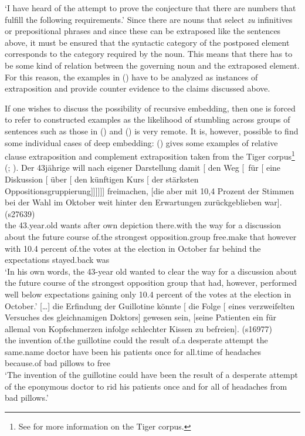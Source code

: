 \glt `I have heard of the attempt to prove the conjecture that there are numbers that fulfill the following requirements.'
\zl
Since there are nouns that select \emph{zu} infinitives or prepositional phrases and since these can
be extraposed like the sentences above, it must be ensured that the syntactic category of the postposed element corresponds to the category required by the noun.
This means that there has to be some kind of relation between the governing noun and the extraposed element. For this reason, the examples in
() have to be analyzed as instances of extraposition and provide counter evidence to the claims discussed above.

If one wishes to discuss the possibility of recursive embedding, then one is forced to refer to constructed examples as the likelihood of stumbling across groups of sentences
such as those in () and () is very remote. It is, however, possible to find some individual cases of deep embedding:
() gives some examples of relative clause extraposition and complement extraposition taken from the Tiger corpus\footnote{
  See  for more information on the Tiger corpus.
} (\citealp[--79]{Mueller2007c}; \citealp[Section~2.1]{MM2009a}).
\eal
\ex 
\gll Der 43jährige will nach eigener Darstellung damit [ den Weg [~für [ eine
  Diskussion [ über [ den künftigen Kurs [ der stärksten
  Oppositions\-gruppierung]]]]]] freimachen, [die aber mit 10,4 Prozent
  der Stimmen bei der Wahl im Oktober weit hinter den Erwartungen zurückgeblieben war]. (s27639)\\
  the 43.year.old wants after own depiction there.with {} the way \hspaceThis{[\sub{PP}~}for {} a discussion {} about {} the future course {} of.the strongest
  opposition.group free.make \spacebr{}that however with 10.4 percent
  of.the votes at the election in October far behind the expectations stayed.back was\\
\glt `In his own words, the 43-year old wanted to clear the way for a discussion about the future course of the strongest opposition group that had, however, performed well below expectations gaining only 10.4 percent of the votes at the election in October.'
\ex 
\gll {}[\ldots] die Erfindung der Guillotine könnte [ die Folge [ eines verzweifelten
    Versuches des gleichnamigen Doktors] gewesen sein, [seine Patienten ein für allemal von
    Kopfschmerzen infolge schlechter Kissen zu befreien]. (s16977)\\
	{}{} the invention of.the guillotine could {} the result {} of.a desperate attempt the same.name doctor have been \spacebr{}his patients
once for all.time of headaches because.of bad pillows to free\\
\glt `The invention of the guillotine could have been the result of a desperate attempt of the
eponymous doctor to rid his patients once and for all of headaches from bad pillows.'
\zl

